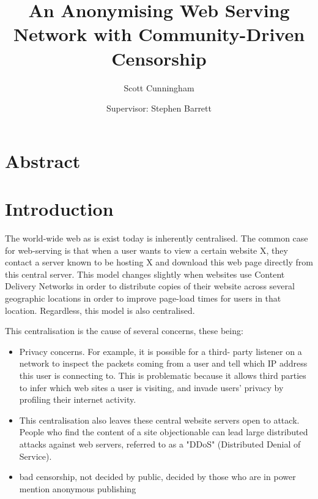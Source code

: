 \documentclass{article}
\title{An Anonymising Web Serving Network with Community-Driven Censorship}
\begin{document}
\author{Scott Cunningham}
\date{Supervisor: Stephen Barrett}

\maketitle{}


\newpage{}

\tableofcontents{}

\newpage{}

\section*{Abstract}

\newpage{}
\section{Introduction}
%

The world-wide web as is exist today is inherently centralised. The common case for web-serving is
that when a user wants to view a certain website X, they contact a server known to be hosting X and
download this web page directly from this central server. This model changes slightly when websites
use Content Delivery Networks in order to distribute copies of their website across several
geographic locations in order to improve page-load times for users in that location. Regardless,
this model is also centralised.

This centralisation is the cause of several concerns, these being:
\begin{itemize}
    \item{Privacy concerns. For example, it is possible for a third-
          party listener on a network to inspect the packets coming from a user and tell which IP address
          this user is connecting to. This is problematic because it allows third parties to infer which web
          sites a user is visiting, and invade users' privacy by profiling their internet activity.}
    \item{This centralisation also leaves these central website servers open to attack. People who find the
content of a site objectionable can lead large distributed attacks against web servers, referred
to as a "DDoS" (Distributed Denial of Service).}
    \item{bad censorship, not decided by public, decided by those who are in power}
mention anonymous publishing

\end{itemize}
\end{document}
